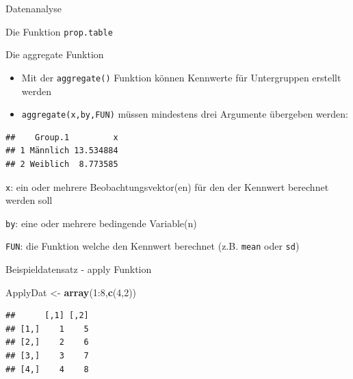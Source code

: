 \documentclass[ignorenonframetext,]{beamer}
\newenvironment{Shaded}{}{}
\newcommand{\KeywordTok}[1]{\textcolor[rgb]{0.00,0.44,0.13}{\textbf{{#1}}}}
\newcommand{\DataTypeTok}[1]{\textcolor[rgb]{0.56,0.13,0.00}{{#1}}}
\newcommand{\DecValTok}[1]{\textcolor[rgb]{0.25,0.63,0.44}{{#1}}}
\newcommand{\StringTok}[1]{\textcolor[rgb]{0.25,0.44,0.63}{{#1}}}
\newcommand{\NormalTok}[1]{{#1}}
\providecommand{\tightlist}{%
\setlength{\itemsep}{0pt}\setlength{\parskip}{0pt}}
\begin{document}
\begin{frame}[fragile]{Datenanalyse}
\begin{block}{Die Funktion \texttt{prop.table}}
\end{block}

\begin{block}{Die aggregate Funktion}

\begin{itemize}
\tightlist
\item
  Mit der \texttt{aggregate()} Funktion können Kennwerte für
  Untergruppen erstellt werden
\item
  \texttt{aggregate(x,by,FUN)} müssen mindestens drei Argumente
  übergeben werden:
\end{itemize}

\begin{Shaded}
\end{Shaded}

\begin{verbatim}
##    Group.1         x
## 1 Männlich 13.534884
## 2 Weiblich  8.773585
\end{verbatim}

\texttt{x}: ein oder mehrere Beobachtungsvektor(en) für den der Kennwert
berechnet werden soll

\texttt{by}: eine oder mehrere bedingende Variable(n)

\texttt{FUN}: die Funktion welche den Kennwert berechnet (z.B.
\texttt{mean} oder \texttt{sd})

\end{block}

\begin{block}{Beispieldatensatz - apply Funktion}

\begin{Shaded}
\begin{Highlighting}[]
\NormalTok{ApplyDat <-}\StringTok{ }\KeywordTok{array}\NormalTok{(}\DecValTok{1}\NormalTok{:}\DecValTok{8}\NormalTok{,}\KeywordTok{c}\NormalTok{(}\DecValTok{4}\NormalTok{,}\DecValTok{2}\NormalTok{))}
\end{Highlighting}
\end{Shaded}

\begin{verbatim}
##      [,1] [,2]
## [1,]    1    5
## [2,]    2    6
## [3,]    3    7
## [4,]    4    8
\end{verbatim}

\end{block}


\end{frame}
\end{document}
